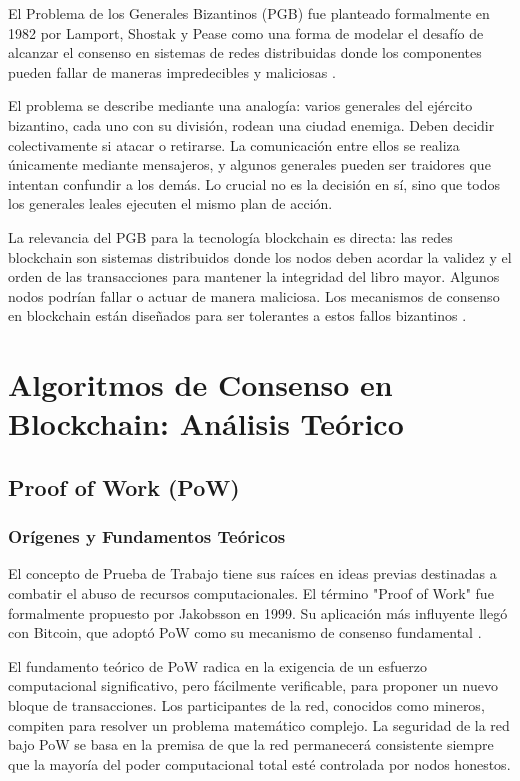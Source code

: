 \documentclass[spanish,12pt,letterpaper]{report}
\begin{document}
El Problema de los Generales Bizantinos (PGB) fue planteado formalmente en 1982 por Lamport, Shostak y Pease como una forma de modelar el desafío de alcanzar el consenso en sistemas de redes distribuidas donde los componentes pueden fallar de maneras impredecibles y maliciosas \parencite{amores2020blockchain}.

El problema se describe mediante una analogía: varios generales del ejército bizantino, cada uno con su división, rodean una ciudad enemiga. Deben decidir colectivamente si atacar o retirarse. La comunicación entre ellos se realiza únicamente mediante mensajeros, y algunos generales pueden ser traidores que intentan confundir a los demás. Lo crucial no es la decisión en sí, sino que todos los generales leales ejecuten el mismo plan de acción.

La relevancia del PGB para la tecnología blockchain es directa: las redes blockchain son sistemas distribuidos donde los nodos deben acordar la validez y el orden de las transacciones para mantener la integridad del libro mayor. Algunos nodos podrían fallar o actuar de manera maliciosa. Los mecanismos de consenso en blockchain están diseñados para ser tolerantes a estos fallos bizantinos \parencite{castro1999practical}.

\section{Algoritmos de Consenso en Blockchain: Análisis Teórico}

\subsection{Proof of Work (PoW)}

\subsubsection{Orígenes y Fundamentos Teóricos}

El concepto de Prueba de Trabajo tiene sus raíces en ideas previas destinadas a combatir el abuso de recursos computacionales. El término "Proof of Work" fue formalmente propuesto por Jakobsson en 1999. Su aplicación más influyente llegó con Bitcoin, que adoptó PoW como su mecanismo de consenso fundamental \parencite{nakamoto2008bitcoin}.

El fundamento teórico de PoW radica en la exigencia de un esfuerzo computacional significativo, pero fácilmente verificable, para proponer un nuevo bloque de transacciones. Los participantes de la red, conocidos como mineros, compiten para resolver un problema matemático complejo. La seguridad de la red bajo PoW se basa en la premisa de que la red permanecerá consistente siempre que la mayoría del poder computacional total esté controlada por nodos honestos.
\end{document}
